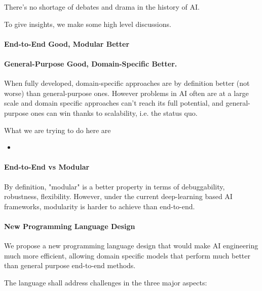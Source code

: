 \documentclass[../main.tex]{subfiles}
\begin{document}
There's no shortage of debates and drama in the history of AI.

To give insights, we make some high level discussions.

\paragraph {End-to-End Good, Modular Better}

\paragraph {General-Purpose Good, Domain-Specific Better.} When fully developed, domain-specific approaches are by definition better (not worse) than general-purpose ones. However problems in AI often are at a large scale and domain specific approaches can't reach its full potential, and  general-purpose ones can win thanks to scalability, i.e. the status quo.

What we are trying to do here are
\begin{itemize}
	\item 
\end{itemize}

\paragraph {End-to-End vs Modular} By definition, "modular" is a better property in terms of debuggability, robustness, flexibility. However, under the current deep-learning based AI frameworks, modularity is harder to achieve than end-to-end.

\paragraph {New Programming Language Design}
We propose a new programming language design that would make AI engineering much more efficient, allowing domain specific models that perform much better than general purpose end-to-end methods.

The language shall address challenges in the three major aspects:
\end{document}
